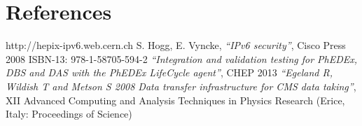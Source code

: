 \section*{References}

\begin{thebibliography}{1}
 http://hepix-ipv6.web.cern.ch
 S. Hogg, E. Vyncke,
    {\it ``IPv6 security''}, Cisco Press 2008 ISBN-13: 978-1-58705-594-2
    {\it ``Integration and validation testing for PhEDEx, DBS and DAS with the PhEDEx LifeCycle agent''}, CHEP 2013
    {\it ``Egeland R, Wildish T and Metson S 2008 Data transfer infrastructure for CMS data taking''},  XII Advanced Computing and Analysis Techniques in Physics Research (Erice, Italy: Proceedings of Science)
\end{thebibliography}
